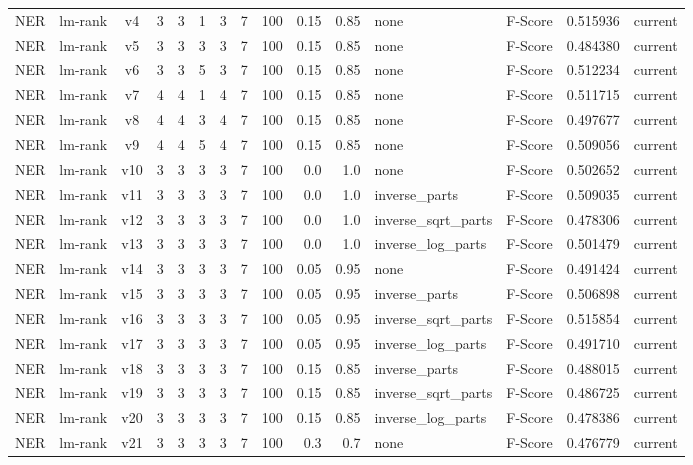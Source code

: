 \documentclass{article}
\begin{document}
\begin{xltabular}{\linewidth}{@{}lYcrrrrrrrrYlrl@{}}
NER & lm-rank & v4 & 3 & 3 & 1 & 3 & 7 & 100 & 0.15 & 0.85 & none & F-Score & 0.515936 & current \\
NER & lm-rank & v5 & 3 & 3 & 3 & 3 & 7 & 100 & 0.15 & 0.85 & none & F-Score & 0.484380 & current \\
NER & lm-rank & v6 & 3 & 3 & 5 & 3 & 7 & 100 & 0.15 & 0.85 & none & F-Score & 0.512234 & current \\
NER & lm-rank & v7 & 4 & 4 & 1 & 4 & 7 & 100 & 0.15 & 0.85 & none & F-Score & 0.511715 & current \\
NER & lm-rank & v8 & 4 & 4 & 3 & 4 & 7 & 100 & 0.15 & 0.85 & none & F-Score & 0.497677 & current \\
NER & lm-rank & v9 & 4 & 4 & 5 & 4 & 7 & 100 & 0.15 & 0.85 & none & F-Score & 0.509056 & current \\
NER & lm-rank & v10 & 3 & 3 & 3 & 3 & 7 & 100 & 0.0 & 1.0 & none & F-Score & 0.502652 & current \\
NER & lm-rank & v11 & 3 & 3 & 3 & 3 & 7 & 100 & 0.0 & 1.0 & inverse\_parts & F-Score & 0.509035 & current \\
NER & lm-rank & v12 & 3 & 3 & 3 & 3 & 7 & 100 & 0.0 & 1.0 & inverse\_sqrt\_parts & F-Score & 0.478306 & current \\
NER & lm-rank & v13 & 3 & 3 & 3 & 3 & 7 & 100 & 0.0 & 1.0 & inverse\_log\_parts & F-Score & 0.501479 & current \\
NER & lm-rank & v14 & 3 & 3 & 3 & 3 & 7 & 100 & 0.05 & 0.95 & none & F-Score & 0.491424 & current \\
NER & lm-rank & v15 & 3 & 3 & 3 & 3 & 7 & 100 & 0.05 & 0.95 & inverse\_parts & F-Score & 0.506898 & current \\
NER & lm-rank & v16 & 3 & 3 & 3 & 3 & 7 & 100 & 0.05 & 0.95 & inverse\_sqrt\_parts & F-Score & 0.515854 & current \\
NER & lm-rank & v17 & 3 & 3 & 3 & 3 & 7 & 100 & 0.05 & 0.95 & inverse\_log\_parts & F-Score & 0.491710 & current \\
NER & lm-rank & v18 & 3 & 3 & 3 & 3 & 7 & 100 & 0.15 & 0.85 & inverse\_parts & F-Score & 0.488015 & current \\
NER & lm-rank & v19 & 3 & 3 & 3 & 3 & 7 & 100 & 0.15 & 0.85 & inverse\_sqrt\_parts & F-Score & 0.486725 & current \\
NER & lm-rank & v20 & 3 & 3 & 3 & 3 & 7 & 100 & 0.15 & 0.85 & inverse\_log\_parts & F-Score & 0.478386 & current \\
NER & lm-rank & v21 & 3 & 3 & 3 & 3 & 7 & 100 & 0.3 & 0.7 & none & F-Score & 0.476779 & current \\

\end{xltabular}
\end{document}
